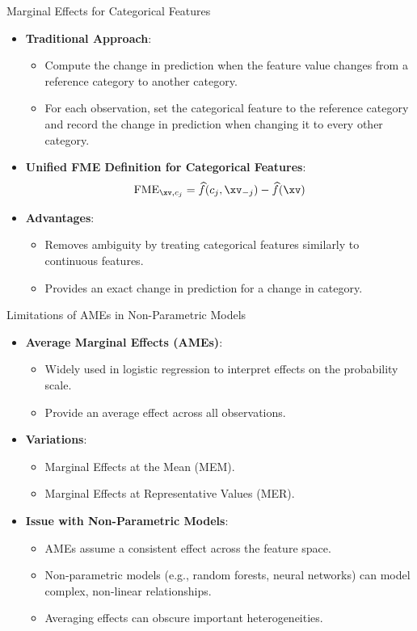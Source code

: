 \documentclass[11pt,compress,t,notes=noshow, aspectratio=169, xcolor=table]{beamer}
\begin{document}
\begin{frame}{Marginal Effects for Categorical Features}
\begin{itemize}
\item \textbf{Traditional Approach}:
\begin{itemize}
\item Compute the change in prediction when the feature value changes from a reference category to another category.
\item For each observation, set the categorical feature to the reference category and record the change in prediction when changing it to every other category.
\end{itemize}
\item \textbf{Unified FME Definition for Categorical Features}:
\[
\text{FME}_{\xv, c_j} = \widehat{f}(c_j, \xv_{-j}) - \widehat{f}(\xv)
\]
\item \textbf{Advantages}:
\begin{itemize}
\item Removes ambiguity by treating categorical features similarly to continuous features.
\item Provides an exact change in prediction for a change in category.
\end{itemize}
\end{itemize}
\end{frame}


\begin{frame}{Limitations of AMEs in Non-Parametric Models}
\begin{itemize}
\item \textbf{Average Marginal Effects (AMEs)}:
\begin{itemize}
\item Widely used in logistic regression to interpret effects on the probability scale.
\item Provide an average effect across all observations.
\end{itemize}
\item \textbf{Variations}:
\begin{itemize}
\item Marginal Effects at the Mean (MEM).
\item Marginal Effects at Representative Values (MER).
\end{itemize}
\item \textbf{Issue with Non-Parametric Models}:
\begin{itemize}
\item AMEs assume a consistent effect across the feature space.
\item Non-parametric models (e.g., random forests, neural networks) can model complex, non-linear relationships.
\item Averaging effects can obscure important heterogeneities.
\end{itemize}
\end{itemize}
\end{frame}
\end{document}
